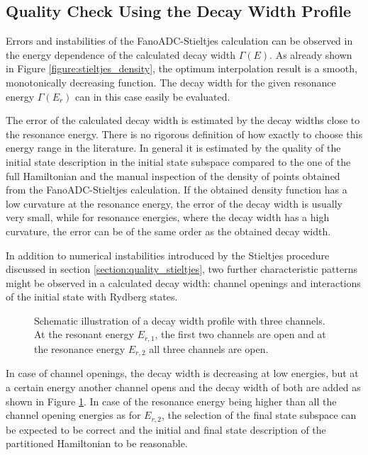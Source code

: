 \subsection{Quality Check Using the Decay Width Profile}
\label{section:Stieltjes_profile_properties}
Errors and instabilities of the FanoADC-Stieltjes calculation can be observed
in the energy dependence of the calculated decay width $\Gamma(E)$.
As already shown in Figure \ref{figure:stieltjes_density}, the optimum
interpolation result is a smooth, monotonically decreasing function.
The decay width for the given resonance energy $\Gamma(E_r)$ can in this case 
easily be evaluated.

The error of the calculated decay width is estimated by the decay widths
close to the resonance energy.
There is no rigorous definition
of how exactly to choose this energy range in the literature. 
In general it is estimated
by the quality of the initial state description in the initial
state subspace compared to the one of the full Hamiltonian and the
manual inspection of the density of points obtained
from the FanoADC-Stieltjes calculation. If
the obtained density function has a low curvature at the resonance energy,
the error of the decay width is usually very small, while for resonance
energies, where the decay width has a high curvature, the error can be of the same
order as the obtained decay width.

In addition to numerical instabilities introduced by the Stieltjes procedure
discussed in section \ref{section:quality_stieltjes},
two further characteristic patterns might be observed in a calculated
decay width: channel openings and interactions of the initial state
with Rydberg states.


\begin{figure}[h]
  \centering
  
  \caption{Schematic illustration of a decay width profile with three
           channels. At the resonant energy $E_{r,1}$, the first two channels
           are open and at the resonance energy $E_{r,2}$ all three channels
           are open.}
  \label{figure:prof_channel_opening}
\end{figure}
In case of channel openings, the decay width is decreasing at low energies, but
at a certain energy another channel opens and the decay width of both are
added as shown in Figure \ref{figure:prof_channel_opening}. In case of the
resonance energy being higher than all the channel opening energies as for
$E_{r,2}$, the
selection of the final state subspace can be expected to be correct
and the initial
and final state description of the partitioned Hamiltonian to be reasonable.

